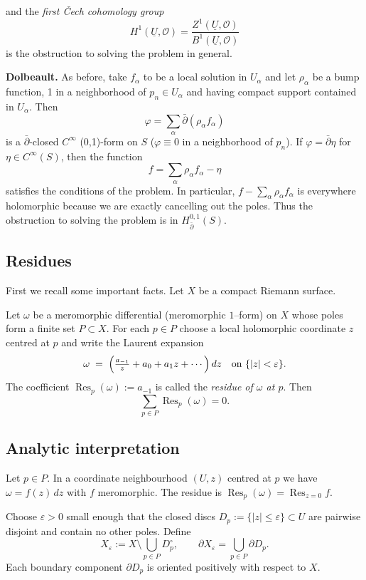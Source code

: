 \documentclass[12pt]{article}
\begin{document}
and the \emph{first \v{C}ech cohomology group}
\[
H^1(\underline{U}, \mathcal{O}) = \frac{Z^1(\underline{U}, \mathcal{O})}{B^1(\underline{U}, \mathcal{O})}
\]
is the obstruction to solving the problem in general.

\textbf{Dolbeault.} As before, take $f_\alpha$ to be a local solution in $U_\alpha$ and let $\rho_\alpha$ be a bump function, 1 in a neighborhood of $p_n \in U_\alpha$ and having compact support contained in $U_\alpha$. Then
\[
\varphi = \sum_\alpha \bar{\partial}(\rho_\alpha f_\alpha)
\]
is a $\bar{\partial}$-closed $C^\infty$ (0,1)-form on $S$ ($\varphi \equiv 0$ in a neighborhood of $p_n$). If $\varphi = \bar{\partial}\eta$ for $\eta \in C^\infty(S)$, then the function
\[
f = \sum_\alpha \rho_\alpha f_\alpha - \eta
\]
satisfies the conditions of the problem. In particular, $f - \sum_\alpha \rho_\alpha f_\alpha$ is everywhere holomorphic because we are exactly cancelling out the poles. Thus the obstruction to solving the problem is in $H_{\bar{\partial}}^{0,1}(S)$.

\subsection{Residues}
First we recall some important facts. Let $X$ be a compact Riemann surface.
\begin{theorem}\label{thm:global-residue}
    Let $\omega$ be a meromorphic differential (meromorphic $1$--form) on $X$ whose poles form a finite set $P \subset X$.  For each $p\in P$ choose a local holomorphic coordinate $z$ centred at $p$ and write the Laurent expansion
    \[
      \omega\;=\;\Bigl(\tfrac{a_{-1}}{z}+a_0+a_1z+\cdots\Bigr)\,dz\quad\text{on }\{|z|<\varepsilon\}.
    \]
    The coefficient $\operatorname{Res}_{p}(\omega):=a_{-1}$ is called the \emph{residue of $\omega$ at $p$}.  Then
    \[
      \boxed{\displaystyle \sum_{p\in P} \operatorname{Res}_{p}(\omega)=0 }.
    \]
    \end{theorem}

\subsection{Analytic interpretation}

    Let $p\in P$.  In a coordinate neighbourhood $(U,z)$ centred at $p$ we have $\omega = f(z)\,dz$ with $f$ meromorphic.  The residue is $\operatorname{Res}_{p}(\omega)=\operatorname{Res}_{z=0}f$.
    

    Choose $\varepsilon>0$ small enough that the closed discs $D_p:=\{|z|\le\varepsilon\}\subset U$ are pairwise disjoint and contain no other poles.  Define
    \[
      X_{\varepsilon}:= X\setminus \bigcup_{p\in P} D_p^{\circ},\qquad \partial X_{\varepsilon}=\bigcup_{p\in P} \partial D_p.
    \]
    Each boundary component $\partial D_p$ is oriented positively with respect to $X$.
    
\end{document}
